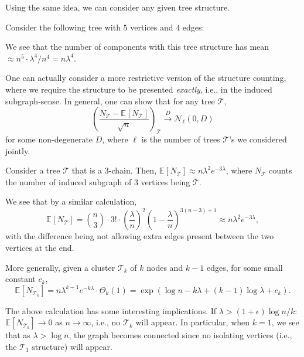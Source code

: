 Using the same idea, we can consider any given tree structure.

\begin{intuition}
	Consider the following tree with \(5\) vertices and \(4\) edges:
	\begin{center}
	\end{center}
	We see that the number of components with this tree structure has mean \(\approx n^5 \cdot \lambda ^4 / n^4 = n \lambda ^4\).
\end{intuition}

One can actually consider a more restrictive version of the structure counting, where we require the structure to be presented \emph{exactly}, i.e., in the induced subgraph-sense. In general, one can show that for any tree \(\mathcal{T} \),
\[
	\left( \frac{N_{\mathcal{T} } - \mathbb{E}_{}[N_{\mathcal{T} }] }{\sqrt{n} } \right) _{\mathcal{T} }
	\overset{D}{\to} \mathcal{N} _\ell (0, D)
\]
for some non-degenerate \(D\), where \(\ell \) is the number of trees \(\mathcal{T} \)'s we considered jointly.

\begin{eg}
	Consider a tree \(\mathcal{T} \) that is a \(3\)-chain. Then, \(\mathbb{E}_{}[N_{\mathcal{T} }] \approx n \lambda ^2 e^{-3\lambda }\), where \(N_{\mathcal{T} } \) counts the number of induced subgraph of \(3\) vertices being \(\mathcal{T} \).
	\begin{center}
	\end{center}
\end{eg}
\begin{explanation}
	We see that by a similar calculation,
	\[
		\mathbb{E}_{}[N_{\mathcal{T} } ]
		= \binom{n}{3} \cdot 3! \cdot \left( \frac{\lambda }{n} \right) ^{2} \left( 1 - \frac{\lambda}{n} \right) ^{3(n-3) + 1}
		\approx n \lambda ^2 e^{-3\lambda },
	\]
	with the difference being not allowing extra edges present between the two vertices at the end.
\end{explanation}

\begin{eg}
	More generally, given a cluster \(\mathcal{T} _k\) of \(k\) nodes and \(k-1\) edges, for some small constant \(c_k\),
	\[
		\mathbb{E}_{}[N_{\mathcal{T} _k} ]
		= n \lambda ^{k-1} e^{-k \lambda } \cdot \Theta _{k} (1)
		= \exp (\log n - k \lambda + (k-1) \log \lambda + c_k).
	\]
\end{eg}

The above calculation has some interesting implications. If \(\lambda > (1 + \epsilon ) \log n / k\): \(\mathbb{E}_{}[N_{\mathcal{T} _k}] \to 0\) as \(n \to \infty \), i.e., no \(\mathcal{T} _k\) will appear. In particular, when \(k = 1\), we see that as \(\lambda > \log n\), the graph becomes connected since no isolating vertices (i.e., the \(\mathcal{T} _1\) structure) will appear.